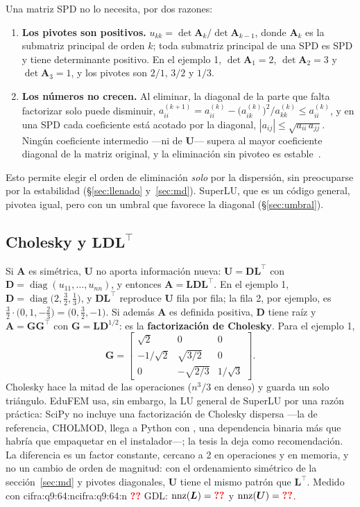 \documentclass[11pt,a4paper]{article}
\newcommand{\cifra}[1]{\ifcsname cifra:#1\endcsname\csname cifra:#1\endcsname\else
  \textbf{\textcolor{red}{??}}\PackageWarning{cifras}{Falta la cifra #1}\fi}
\newcommand{\cod}[1]{\texttt{\detokenize{#1}}}
\newcommand{\nnz}{\operatorname{nnz}}
\newcommand{\T}{^{\top}}
\newcommand{\tf}[2]{\tfrac{#1}{#2}}
\begin{document}
Una matriz SPD no lo necesita, por dos razones:
\begin{enumerate}
  \item \textbf{Los pivotes son positivos.} $u_{kk}=\det\bm{A}_k/\det\bm{A}_{k-1}$, donde $\bm{A}_k$ es la submatriz principal de orden $k$; toda submatriz principal de una SPD es SPD y tiene determinante positivo. En el ejemplo 1, $\det\bm{A}_1=2$, $\det\bm{A}_2=3$ y $\det\bm{A}_3=1$, y los pivotes son $2/1$, $3/2$ y $1/3$.
  \item \textbf{Los números no crecen.} Al eliminar, la diagonal de la parte que falta factorizar solo puede disminuir, $a_{ii}^{(k+1)}=a_{ii}^{(k)}-\bigl(a_{ik}^{(k)}\bigr)^2/a_{kk}^{(k)}\le a_{ii}^{(k)}$, y en una SPD cada coeficiente está acotado por la diagonal, $|a_{ij}|\le\sqrt{a_{ii}\,a_{jj}}$. Ningún coeficiente intermedio ---ni de $\bm{U}$--- supera al mayor coeficiente diagonal de la matriz original, y la eliminación sin pivoteo es estable~\cite{higham2002}.
\end{enumerate}
Esto permite elegir el orden de eliminación \emph{solo} por la dispersión, sin preocuparse por la estabilidad (§\ref{sec:llenado} y~\ref{sec:md}). SuperLU, que es un código general, pivotea igual, pero con un umbral que favorece la diagonal (§\ref{sec:umbral}).

\subsection{Cholesky y \texorpdfstring{$\bm{L}\bm{D}\bm{L}^{\top}$}{LDLT}}\label{sec:cholesky}

Si $\bm{A}$ es simétrica, $\bm{U}$ no aporta información nueva: $\bm{U}=\bm{D}\bm{L}\T$ con $\bm{D}=\operatorname{diag}(u_{11},\dots,u_{nn})$, y entonces $\bm{A}=\bm{L}\bm{D}\bm{L}\T$. En el ejemplo 1, $\bm{D}=\operatorname{diag}\bigl(2,\tf32,\tf13\bigr)$, y $\bm{D}\bm{L}\T$ reproduce $\bm{U}$ fila por fila; la fila 2, por ejemplo, es $\tf32\cdot\bigl(0,1,-\tf23\bigr)=\bigl(0,\tf32,-1\bigr)$. Si además $\bm{A}$ es definida positiva, $\bm{D}$ tiene raíz y $\bm{A}=\bm{G}\bm{G}\T$ con $\bm{G}=\bm{L}\bm{D}^{1/2}$: es la \textbf{factorización de Cholesky}. Para el ejemplo 1,
\[
\bm{G}=\begin{bmatrix}\sqrt2&0&0\\-1/\sqrt2&\sqrt{3/2}&0\\0&-\sqrt{2/3}&1/\sqrt3\end{bmatrix}.
\]
Cholesky hace la mitad de las operaciones ($n^3/3$ en denso) y guarda un solo triángulo. EduFEM usa, sin embargo, la LU general de SuperLU por una razón práctica: SciPy no incluye una factorización de Cholesky dispersa ---la de referencia, CHOLMOD, llega a Python con \cod{scikit-sparse}, una dependencia binaria más que habría que empaquetar en el instalador---; la tesis la deja como recomendación. La diferencia es un factor constante, cercano a 2 en operaciones y en memoria, y no un cambio de orden de magnitud: con el ordenamiento simétrico de la sección~\ref{sec:md} y pivotes diagonales, $\bm{U}$ tiene el mismo patrón que $\bm{L}\T$. Medido con \cifra{q9:64:n} GDL: $\nnz(\bm{L})=\cifra{q9:64:nnzL}$ y $\nnz(\bm{U})=\cifra{q9:64:nnzU}$.
\end{document}
